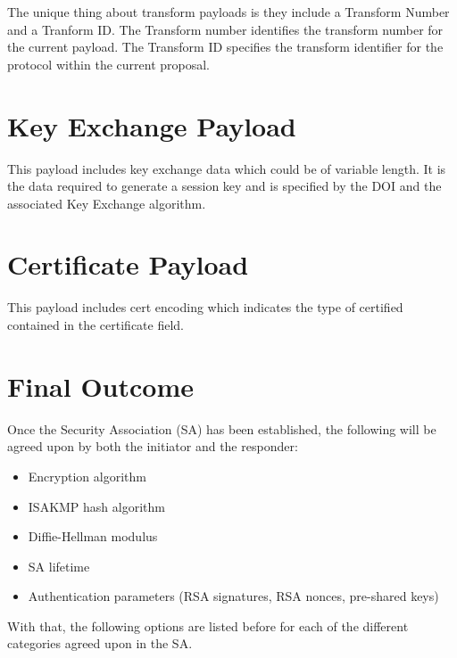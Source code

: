 \documentclass{report}
\begin{document}
The unique thing about transform payloads is they include a Transform Number and a Tranform ID. The Transform number identifies the transform number for the current payload. The Transform ID specifies the transform identifier for the protocol within the current proposal. 

\section {Key Exchange Payload}

This payload includes key exchange data which could be of variable length. It is the data required to generate a session key and is specified by the DOI and the associated Key Exchange algorithm.

\section {Certificate Payload}

This payload includes cert encoding which indicates the type of certified contained in the certificate field. 

\section{Final Outcome}

Once the Security Association (SA) has been established, the following will be agreed upon by both the initiator and the responder:

\begin{itemize}
\item Encryption algorithm
\item ISAKMP hash algorithm
\item Diffie-Hellman modulus
\item SA lifetime
\item Authentication parameters (RSA signatures, RSA nonces, pre-shared keys)
\end{itemize}

With that, the following options are listed before for each of the different categories agreed upon in the SA. 
\end{document}
